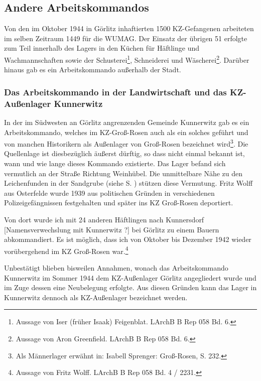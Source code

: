 \documentclass[a4paper,12pt,ngerman,
]{nisebook}
\begin{document}
\subsection{Andere Arbeitskommandos}
\label{lagerarbeit}
Von den im Oktober 1944 in Görlitz inhaftierten 1500 KZ-Gefangenen arbeiteten im selben Zeitraum 1449 für die WUMAG. Der Einsatz der übrigen 51 erfolgte zum Teil innerhalb des Lagers in den Küchen für Häftlinge und Wachmannschaften sowie der Schusterei\footnote{Aussage von Iser (früher Isaak) Feigenblat. LArchB B Rep 058 Bd. 6.}, Schneiderei und Wäscherei\footnote{Aussage von Aron Greenfield. LArchB B Rep 058 Bd. 6.}. Darüber hinaus gab es ein Arbeitskommando außerhalb der Stadt.

\subsubsection{Das Arbeitskommando in der Landwirtschaft und das KZ-Außenlager Kunnerwitz}
\label{alkunnerwizt}
In der im Südwesten an Görlitz angrenzenden Gemeinde Kunnerwitz gab es ein Arbeitskommando, welches im KZ-Groß-Rosen auch als ein solches geführt und von manchen Historikern als Außenlager von Groß-Rosen bezeichnet wird\footnote{Als Männerlager erwähnt in: Isabell Sprenger: Groß-Rosen, S. 232.}. Die Quellenlage ist diesbezüglich äußerst dürftig, so dass nicht einmal bekannt ist, wann und wie lange dieses Kommando existierte. Das Lager befand sich vermutlich an der Straße Richtung Weinhübel. Die unmittelbare Nähe zu den Leichenfunden in der Sandgrube (siehe S. \pageref{kunnerwitz}) stützen diese Vermutung.\newline
Fritz Wolff aus Osterfelde wurde 1939 aus politischen Gründen in verschiedenen Polizeigefängnissen festgehalten und später ins KZ Groß-Rosen deportiert.
\begin{leftbar}
Von dort wurde ich mit 24 anderen Häftlingen nach Kunnersdorf [Namensverwechslung mit Kunnerwitz ?] bei Görlitz zu einem Bauern abkommandiert. Es ist möglich, dass ich von Oktober bis Dezember 1942 wieder vorübergehend im KZ Groß-Rosen war.\footnote{Aussage von Fritz Wolff. LArchB B Rep 058 Bd. 4 / 2231.}
\end{leftbar}

Unbestätigt blieben bisweilen Annahmen, wonach das Arbeitskommando Kunnerwitz im Sommer 1944 dem KZ-Außenlager Görlitz angegliedert wurde und im Zuge dessen eine Neubelegung erfolgte. Aus diesen Gründen kann das Lager in Kunnerwitz dennoch als KZ-Außenlager bezeichnet werden.
\end{document}
